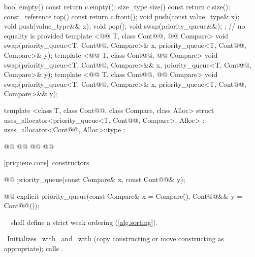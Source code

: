 \documentclass[american,twoside]{book}
\begin{document}
\begin{codeblock}
{{    bool      empty() const       { return c.empty(); }
    size_type size()  const       { return c.size(); }
    const_reference   top() const { return c.front(); }
    void push(const value_type& x);
    void push(value_type&& x);
    void pop();
    void swap(priority_queue&&);
  };
                // no equality is provided
  template <@@ T, class Cont@@, @@ Compare>
    void swap(priority_queue<T, Cont@@, Compare>& x, priority_queue<T, Cont@@, Compare>& y);
  template <@@ T, class Cont@@, @@ Compare>
    void swap(priority_queue<T, Cont@@, Compare>&& x, priority_queue<T, Cont@@, Compare>& y);
  template <@@ T, class Cont@@, @@ Compare>
    void swap(priority_queue<T, Cont@@, Compare>& x, priority_queue<T, Cont@@, Compare>&& y);

  template <class T, class Cont@@, class Compare, class Alloc>
    struct uses_allocator<priority_queue<T, Cont@@, Compare>, Alloc>
      : uses_allocator<Cont@@, Alloc>::type { };

  @@
    @@
      @@
      @@
}
\end{codeblock}

[priqueue.cons]{\ constructors}

%
\begin{itemdecl}
@@ priority_queue(const Compare& x, const Cont@@& y);

@@ 
explicit priority_queue(const Compare& x = Compare(), Cont@@&& y = Cont@@());
\end{itemdecl}

\begin{itemdescr}
\pnum
\requires\ 
\ shall define a strict weak ordering (\ref{alg.sorting}).

\pnum
\effects\ 
Initializes
\ with
\ and
\ with
 (copy constructing or move constructing as appropriate);
calls
\tcode{make_heap(c.begin(), c.end(), comp)}.
\end{itemdescr}
\end{document}
